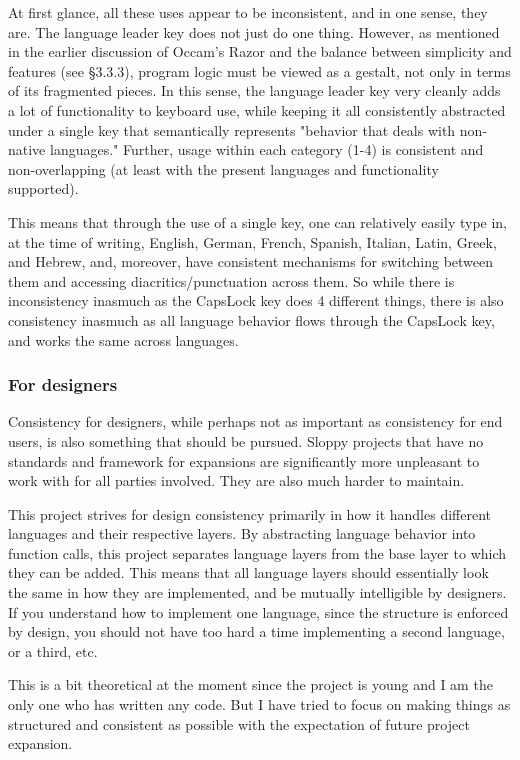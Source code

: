 \documentclass[11pt]{article}
\begin{document}
At first glance, all these uses appear to be inconsistent, and in one sense, they are. The language leader key does not just do one thing. However, as mentioned in the earlier discussion of Occam's Razor and the balance between simplicity and features (see §3.3.3), program logic must be viewed as a gestalt, not only in terms of its fragmented pieces. In this sense, the language leader key very cleanly adds a lot of functionality to keyboard use, while keeping it all consistently abstracted under a single key that semantically represents "behavior that deals with non-native languages." Further, usage within each category (1-4) is consistent and non-overlapping (at least with the present languages and functionality supported).

This means that through the use of a single key, one can relatively easily type in, at the time of writing, English, German, French, Spanish, Italian, Latin, Greek, and Hebrew, and, moreover, have consistent mechanisms for switching between them and accessing diacritics/punctuation across them. So while there is inconsistency inasmuch as the CapsLock key does 4 different things, there is also consistency inasmuch as all language behavior flows through the CapsLock key, and works the same across languages.

\subsubsection{For designers}
\label{sec:org8d5ca63}

Consistency for designers, while perhaps not as important as consistency for end users, is also something that should be pursued. Sloppy projects that have no standards and framework for expansions are significantly more unpleasant to work with for all parties involved. They are also much harder to maintain.

This project strives for design consistency primarily in how it handles different languages and their respective layers. By abstracting language behavior into function calls, this project separates language layers from the base layer to which they can be added. This means that all language layers should essentially look the same in how they are implemented, and be mutually intelligible by designers. If you understand how to implement one language, since the structure is enforced by design, you should not have too hard a time implementing a second language, or a third, etc.

This is a bit theoretical at the moment since the project is young and I am the only one who has written any code. But I have tried to focus on making things as structured and consistent as possible with the expectation of future project expansion.
\end{document}
